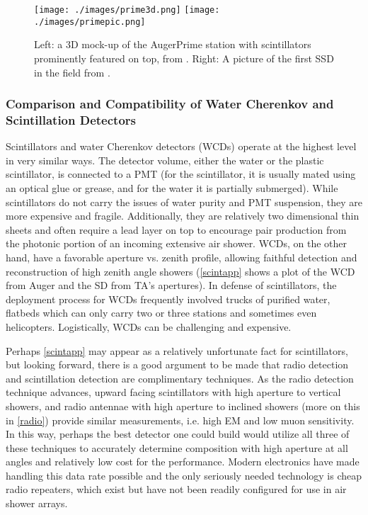 \begin{figure}[h!]
\begin{center}
\texttt{[image: ./images/prime3d.png]}
\texttt{[image: ./images/primepic.png]}
\caption[AugerPrime Stations]{Left: a 3D mock-up of the AugerPrime station with scintillators prominently featured on top, from \cite{toprime}. Right: A picture of the first SSD in the field from \cite{augerscint}.}
\label{primepics}
\end{center}
\end{figure}
\begin{singlespace}
\subsubsection{Comparison and Compatibility of Water Cherenkov and Scintillation Detectors}
\end{singlespace}

Scintillators and water Cherenkov detectors (WCDs) operate at the highest level in very similar ways. The detector volume, either the water or the plastic scintillator, is connected to a PMT (for the scintillator, it is usually mated using an optical glue or grease, and for the water it is partially submerged). While scintillators do not carry the issues of water purity and PMT suspension, they are more expensive and fragile. Additionally, they are relatively two dimensional thin sheets and often require a lead layer on top to encourage pair production from the photonic portion of an incoming extensive air shower. WCDs, on the other hand, have a favorable aperture vs. zenith profile, allowing faithful detection and reconstruction of high zenith angle showers (\autoref{scintapp} shows a plot of the WCD from Auger and the SD from TA's apertures). In defense of scintillators, the deployment process for WCDs frequently involved trucks of purified water, flatbeds which can only carry two or three stations and sometimes even helicopters. Logistically, WCDs can be challenging and expensive.

Perhaps \autoref{scintapp} may appear as a relatively unfortunate fact for scintillators, but looking forward, there is a good argument to be made that radio detection and scintillation detection are complimentary techniques. As the radio detection technique advances, upward facing scintillators with high aperture to vertical showers, and radio antennae with high aperture to inclined showers (more on this in \autoref{radio}) provide similar measurements, i.e. high EM and low muon sensitivity. In this way, perhaps the best detector one could build would utilize all three of these techniques to accurately determine composition with high aperture at all angles and relatively low cost for the performance. Modern electronics have made handling this data rate possible and the only seriously needed technology is cheap radio repeaters, which exist but have not been readily configured for use in air shower arrays.

